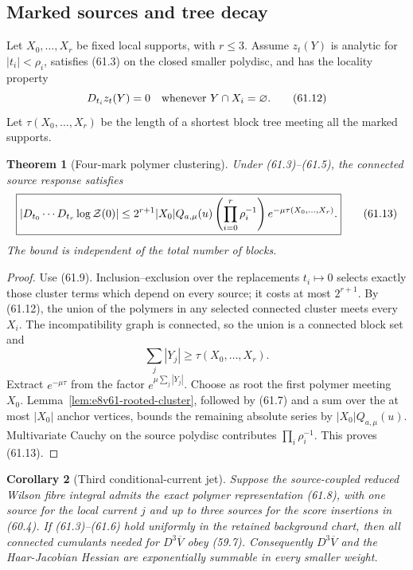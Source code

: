 \documentclass[11pt,oneside]{book}
\newtheorem{theorem}{Theorem}[chapter]
\newtheorem{corollary}[theorem]{Corollary}
\theoremstyle{definition}
\theoremstyle{remark}
\begin{document}
\subsection{Marked sources and tree decay}

Let \(X_0,\ldots,X_r\) be fixed local supports, with \(r\le3\).
Assume \(z_t(Y)\) is analytic for \(|t_i|<\rho_i\), satisfies
(61.3) on the closed smaller polydisc, and has the locality property
\[
 D_{t_i}z_t(Y)=0\quad\hbox{whenever }Y\cap X_i=\varnothing.   \tag{61.12}
\]
Let \(\tau(X_0,\ldots,X_r)\) be the length of a shortest block
tree meeting all the marked supports.

\begin{theorem}[Four-mark polymer clustering]
\label{thm:e8v61-four-mark-cluster}
Under (61.3)--(61.5), the connected source response satisfies
\[
\boxed{
 \left|
 D_{t_0}\cdots D_{t_r}\log{\cal Z}(0)
 \right|
 \le
 2^{r+1}|X_0|Q_{a,\mu}(u)
 \left(\prod_{i=0}^r\rho_i^{-1}\right)
 e^{-\mu\tau(X_0,\ldots,X_r)}.}                             \tag{61.13}
\]
The bound is independent of the total number of blocks.
\end{theorem}

\begin{proof}
Use (61.9).  Inclusion--exclusion over the replacements
\(t_i\mapsto0\) selects exactly those cluster terms which depend on
every source; it costs at most \(2^{r+1}\).  By (61.12), the union
of the polymers in any selected connected cluster meets every
\(X_i\).  The incompatibility graph is connected, so the union is a
connected block set and
\[
 \sum_j|Y_j|\ge \tau(X_0,\ldots,X_r).                       \tag{61.14}
\]
Extract \(e^{-\mu\tau}\) from the factor
\(e^{\mu\sum_j|Y_j|}\).  Choose as root the first polymer meeting
\(X_0\).  Lemma~\ref{lem:e8v61-rooted-cluster}, followed by
(61.7) and a sum over the at most \(|X_0|\) anchor vertices, bounds
the remaining absolute series by \(|X_0|Q_{a,\mu}(u)\).
Multivariate Cauchy on the source polydisc contributes
\(\prod_i\rho_i^{-1}\).  This proves (61.13).
\end{proof}

\begin{corollary}[Third conditional-current jet]
\label{cor:e8v61-third-current}
Suppose the source-coupled reduced Wilson fibre integral admits the
exact polymer representation (61.8), with one source for the local
current \(j\) and up to three sources for the score insertions in
(60.4).  If (61.3)--(61.6) hold uniformly in the retained
background chart, then all connected cumulants needed for
\(D^3\overline V\) obey (59.7).  Consequently
\(D^3\overline V\) and the Haar-Jacobian Hessian are exponentially
summable in every smaller weight.
\end{corollary}
\end{document}
